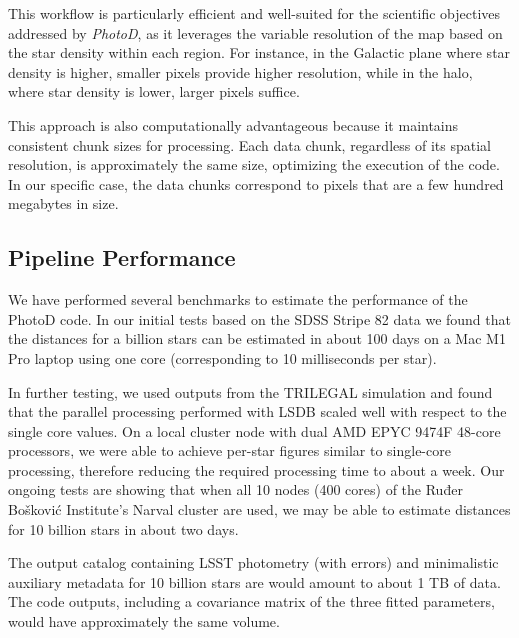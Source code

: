 


This workflow is particularly efficient and well-suited for the scientific objectives addressed by {\em PhotoD}, as it leverages the variable resolution of the map based on the star density within each region. For instance, in the Galactic plane where star density is higher, smaller pixels provide higher resolution, while in the halo, where star density is lower, larger pixels suffice.

This approach is also computationally advantageous because it maintains consistent chunk sizes for processing. Each data chunk, regardless of its spatial resolution, is approximately the same size, optimizing the execution of the code. In our specific case, the data chunks correspond to pixels that are a few hundred megabytes in size.
 
 
\subsection{Pipeline Performance}

We have performed several benchmarks to estimate the performance of the PhotoD code. In our initial tests based on the SDSS Stripe 82 data we found that the distances for a billion stars can be estimated in about 100 days on a Mac M1 Pro laptop using one core (corresponding to 10 milliseconds per star). 

In further testing, we used outputs from the TRILEGAL simulation and found that the parallel processing performed with LSDB scaled well with respect to the single core values. On a local cluster node with dual AMD EPYC 9474F 48-core processors, we were able to achieve per-star figures similar to single-core processing, therefore reducing the required processing time to about a week. Our ongoing tests are showing that when all 10 nodes (400 cores) of the Ruđer Bošković Institute's Narval cluster are used, we may be able to estimate distances for 10 billion stars in about two days. 

The output catalog containing LSST photometry (with errors) and minimalistic auxiliary metadata for 10 billion stars are would amount to about 1 TB of data. The code outputs, including a covariance matrix of the three fitted parameters, would have approximately the same volume. 
